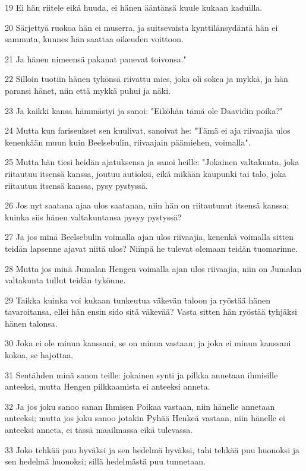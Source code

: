 \par 19 Ei hän riitele eikä huuda, ei hänen ääntänsä kuule kukaan kaduilla.
\par 20 Särjettyä ruokoa hän ei muserra, ja suitsevaista kynttilänsydäntä hän ei sammuta, kunnes hän saattaa oikeuden voittoon.
\par 21 Ja hänen nimeensä pakanat panevat toivonsa."
\par 22 Silloin tuotiin hänen tykönsä riivattu mies, joka oli sokea ja mykkä, ja hän paransi hänet, niin että mykkä puhui ja näki.
\par 23 Ja kaikki kansa hämmästyi ja sanoi: "Eiköhän tämä ole Daavidin poika?"
\par 24 Mutta kun fariseukset sen kuulivat, sanoivat he: "Tämä ei aja riivaajia ulos kenenkään muun kuin Beelsebulin, riivaajain päämiehen, voimalla".
\par 25 Mutta hän tiesi heidän ajatuksensa ja sanoi heille: "Jokainen valtakunta, joka riitautuu itsensä kanssa, joutuu autioksi, eikä mikään kaupunki tai talo, joka riitautuu itsensä kanssa, pysy pystyssä.
\par 26 Jos nyt saatana ajaa ulos saatanan, niin hän on riitautunut itsensä kanssa; kuinka siis hänen valtakuntansa pysyy pystyssä?
\par 27 Ja jos minä Beelsebulin voimalla ajan ulos riivaajia, kenenkä voimalla sitten teidän lapsenne ajavat niitä ulos? Niinpä he tulevat olemaan teidän tuomarinne.
\par 28 Mutta jos minä Jumalan Hengen voimalla ajan ulos riivaajia, niin on Jumalan valtakunta tullut teidän tykönne.
\par 29 Taikka kuinka voi kukaan tunkeutua väkevän taloon ja ryöstää hänen tavaroitansa, ellei hän ensin sido sitä väkevää? Vasta sitten hän ryöstää tyhjäksi hänen talonsa.
\par 30 Joka ei ole minun kanssani, se on minua vastaan; ja joka ei minun kanssani kokoa, se hajottaa.
\par 31 Sentähden minä sanon teille: jokainen synti ja pilkka annetaan ihmisille anteeksi, mutta Hengen pilkkaamista ei anteeksi anneta.
\par 32 Ja jos joku sanoo sanan Ihmisen Poikaa vastaan, niin hänelle annetaan anteeksi; mutta jos joku sanoo jotakin Pyhää Henkeä vastaan, niin hänelle ei anteeksi anneta, ei tässä maailmassa eikä tulevassa.
\par 33 Joko tehkää puu hyväksi ja sen hedelmä hyväksi, tahi tehkää puu huonoksi ja sen hedelmä huonoksi; sillä hedelmästä puu tunnetaan.
